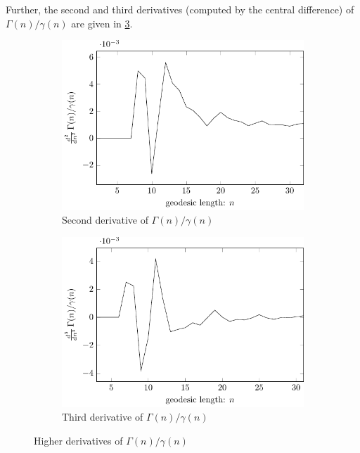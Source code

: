Further, the second and third derivatives (computed by the central difference) of $\Gamma(n)/\gamma(n)$ are given in \cref{fig:normalGrowthRatioD2D3}.

\begin{figure}[!h]
	\centering
	
	\begin{subfigure}{0.48\linewidth}
		\centering
		\includegraphics[width=\linewidth]
		{figures/results/normalGrowth/usual/normalGrowthRatioD2}
		\caption{Second derivative of $\Gamma(n)/\gamma(n)$}
		\label{fig:normalGrowthRatio:linear:D2}
	\end{subfigure}
	\hfill
	\begin{subfigure}{0.48\linewidth}
		\centering
		\includegraphics[width=\linewidth]
		{figures/results/normalGrowth/usual/normalGrowthRatioD3}
		\caption{Third derivative of $\Gamma(n)/\gamma(n)$}
		\label{fig:normalGrowthRatio:log:D3}
	\end{subfigure}
	
	\caption{Higher derivatives of $\Gamma(n)/\gamma(n)$}
	\label{fig:normalGrowthRatioD2D3}
\end{figure}

